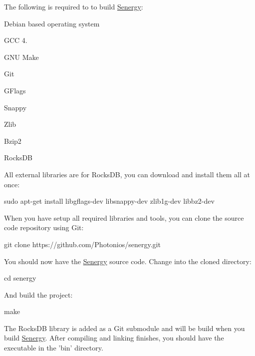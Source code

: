 The following is required to to build \hyperlink{namespace_senergy}{Senergy}\-:


\begin{DoxyItemize}
\item Debian based operating system
\item G\-C\-C 4.
\item G\-N\-U Make
\item Git
\item G\-Flags
\item Snappy
\item Zlib
\item Bzip2
\item Rocks\-D\-B
\end{DoxyItemize}

All external libraries are for Rocks\-D\-B, you can download and install them all at once\-:


\begin{DoxyCode}
sudo apt-\textcolor{keyword}{get} install libgflags-dev libsnappy-dev zlib1g-dev libbz2-dev
\end{DoxyCode}


When you have setup all required libraries and tools, you can clone the source code repository using Git\-:


\begin{DoxyCode}
git clone https:\textcolor{comment}{//github.com/Photonios/senergy.git}
\end{DoxyCode}


You should now have the \hyperlink{namespace_senergy}{Senergy} source code. Change into the cloned directory\-:


\begin{DoxyCode}
cd senergy
\end{DoxyCode}


And build the project\-:


\begin{DoxyCode}
make
\end{DoxyCode}


The Rocks\-D\-B library is added as a Git submodule and will be build when you build \hyperlink{namespace_senergy}{Senergy}. After compiling and linking finishes, you should have the executable in the 'bin' directory. 